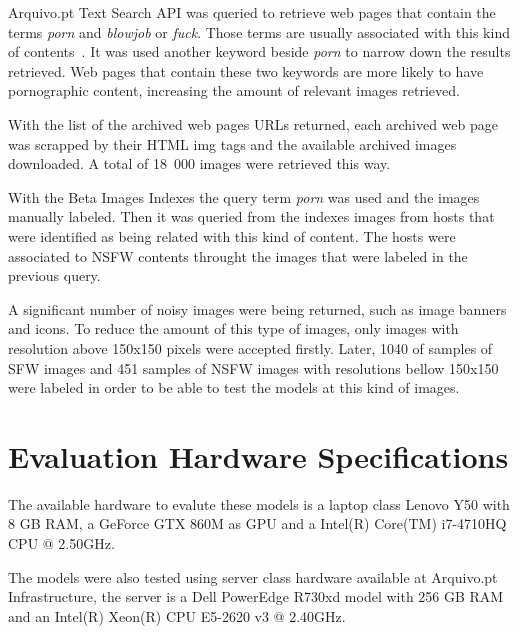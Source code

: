 Arquivo.pt Text Search API  was queried to retrieve web pages that contain the terms \emph{porn} and \emph{blowjob} or \emph{fuck}. Those terms are usually associated with this kind of contents~\cite{bannedkeywords}. It was used another keyword beside \emph{porn} to narrow down the results retrieved. Web pages that contain these two keywords are more likely to have pornographic content, increasing the amount of relevant images retrieved.

With the list of the archived web pages URLs returned, each archived web page was scrapped by their HTML img tags and the available archived images downloaded. A total of 18~000 images were retrieved this way.

With the Beta Images Indexes the query term \emph{porn} was used and the images manually labeled. Then it was queried from the indexes images from hosts that were identified as being related with this kind of content. The hosts were associated to NSFW contents throught the images that were labeled in the previous query.

A significant number of noisy images were being returned, such as image banners and icons. To reduce the amount of this type of images, only images with resolution above 150x150 pixels were accepted firstly.
Later, 1040 of samples of SFW images and 451 samples of NSFW images with resolutions bellow 150x150 were labeled in order to be able to test the models at this kind of images.


\section{Evaluation Hardware Specifications}
\label{sc:eval_hw}

The available hardware to evalute these models is a laptop class Lenovo Y50 with 8 GB RAM, a GeForce GTX 860M as GPU and a Intel(R) Core(TM) i7-4710HQ CPU @ 2.50GHz.

The models were also tested using server class hardware available at Arquivo.pt Infrastructure, the server is a Dell PowerEdge R730xd model with 256 GB RAM and an Intel(R) Xeon(R) CPU E5-2620 v3 @ 2.40GHz.



